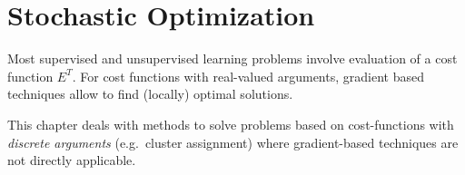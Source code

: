 
\setcounter{equation}{0}
\newpage 
\section{Stochastic Optimization}
\label{sec:stochOptimization}
Most supervised and unsupervised learning problems involve
evaluation of a cost function $E^T$. For cost functions with
real-valued arguments, gradient based techniques allow to find
(locally) optimal solutions.

This chapter deals with methods to solve problems based on
cost-functions with \emph{discrete arguments} (e.g.\ cluster
assignment) where gradient-based techniques are not directly
applicable.


